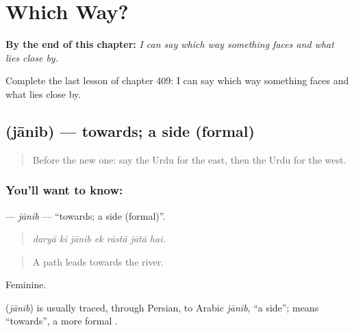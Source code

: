 
\chapter{Which Way?}
\label{ch:ur-which-way}

\begin{chapteropening}
\textbf{By the end of this chapter:} \emph{I can say which way something faces and what lies close by.}

Complete the last lesson of chapter 409: I can say which way something faces and what lies close by.
\end{chapteropening}

\section[\texorpdfstring{\ur{جانب} (jānib)}{جانب (jānib)}]{ (jānib) — towards; a side (formal)}

\label{lesson:UR-C409-janib}



\begin{quote}
Before the new one: say the Urdu for the east, then the Urdu for the west.
\end{quote}

\subsection*{You'll want to know: }
\textbf{} — \emph{jānib} — \textquotedblleft{}towards; a side (formal)\textquotedblright{}.

\begin{quote}
      
\end{quote}

\begin{quote}
\emph{daryā kī jānib ek rāstā jātā hai.}
\end{quote}

\begin{quote}
A path leads towards the river.
\end{quote}

Feminine.

\begin{cousinweb}
\textbf{} (\emph{jānib}) is usually traced, through Persian, to Arabic \emph{jānib}, \textquotedblleft{}a side\textquotedblright{}; \textbf{ } means \textquotedblleft{}towards\textquotedblright{}, a more formal \textbf{ }.
\end{cousinweb}


